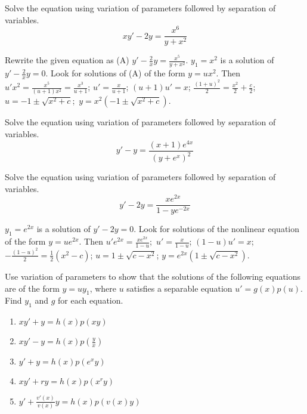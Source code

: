 \documentclass{ximera}
\begin{document}
\begin{problem}\label{exer:2.2.36} Solve the equation using variation of parameters followed by separation of variables.
$$xy'-2y=\frac{x^6}{y+x^2}$$

 

\begin{solution}
    Rewrite the given equation as
(A) $y'-\frac{2}{ x}y=\frac{x^5}{ y+x^2}$.
 $y_1=x^2$ is a solution of $y'-\frac{2}{ x}y=0$.
Look for solutions of (A)  of the form $y=ux^2$.
Then $u'x^2=\frac{x^5}{(u+1)x^2}=\frac{x^3}{ u+1}$;\;
$u'=\frac{x}{ u+1}$;\;
$(u+1)u'=x$;\;
$\frac{(1+u)^2}{2}=\frac{x^2}{2}+\frac{c}{2}$;\;
$u=-1\pm\sqrt{x^2+c}$;\ $y=x^2\left(-1\pm\sqrt{x^2+c}\right)$.
\end{solution}
\end{problem}

 \begin{problem}\label{exer:2.2.37} Solve the equation using variation of parameters followed by separation of variables.
 $$y'-y=\frac{(x+1)e^{4x}}{(y+e^x)^2}$$
\end{problem}
 
\begin{problem}\label{exer:2.2.38} Solve the equation using variation of parameters followed by separation of variables.
$$y'-2y=\frac{xe^{2x}}{1-ye^{-2x}}$$

 

\begin{solution}
    $y_1=e^{2x}$ is a solution of $y'-2y=0$.
Look for solutions of the nonlinear equation of the form $y=ue^{2x}$.
Then $u'e^{2x}=\frac{xe^{2x}}{1-u}$;\ $u'=\frac{x}{1-u}$;\;
$(1-u)u'=x$;\;
$-\frac{(1-u)^2}{2}=\frac{1}{2}(x^2-c)$;\;
$u=1\pm\sqrt{c-x^2}$;\;
$y=e^{2x}\left(1\pm\sqrt{c-x^2}\right)$.
\end{solution}
\end{problem}


\begin{problem}\label{exer:2.2.39}
Use variation of parameters to show that the solutions of the
following equations are of the form $y=uy_1$, where $u$ satisfies a
separable equation $u'=g(x)p(u)$. Find $y_1$ and $g$ for each
equation.

\begin{enumerate}
    \item 
$xy'+y=h(x)p(xy)$
    \item 
    $xy'-y=h(x) p\left(\frac{y}{x}\right)$
    \item 
    $y'+y=h(x) p(e^xy)$
    \item 
    $xy'+ry=h(x) p(x^ry)$
    \item 
    $y'+\frac{v'(x)}{v(x)}y= h(x)p\left(v(x)y\right)$
\end{enumerate}
\end{problem}
\end{document}
